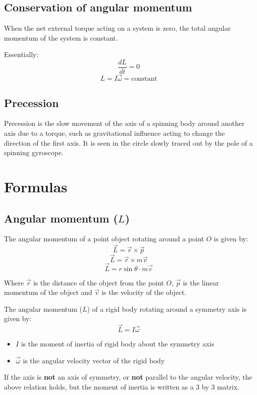 \documentclass[11pt]{article}
\begin{document}
\newpage
\subsection{Conservation of angular momentum}
\label{sec:org2fcfb08}
When the net external torque acting on a system is zero, the total angular momentum of the system is constant.


Essentially:
\[\frac{dL}{dt} = 0\]
\[L = I \vec{\omega} = \text{constant}\]
\subsection{Precession}
\label{sec:orgd465672}
Precession is the slow movement of the axis of a spinning body around another axis due to a torque, such as gravitational influence acting to change the direction of the first axis. It is seen in the circle slowly traced out by the pole of a spinning gyroscope.
\section{Formulas}
\label{sec:org6a5db6c}

\subsection{Angular momentum (\(L\))}
\label{sec:org268d8e3}
The angular momentum of a point object rotating around a point \(O\) is given by:
\[\vec{L} = \vec{r} \times \vec{p}\]
\[\vec{L} = \vec{r} \times m \vec{v}\]
\[\vec{L} = r \sin \theta \cdot m \vec{v}\]

Where \(\vec{r}\) is the distance of the object from the point \(O\), \(\vec{p}\) is the linear momentum of the object and \(\vec{v}\) is the velocity of the object.


The angular momentum (\(L\)) of a rigid body rotating around a symmetry axis is given by:
\[\vec{L} = I \vec{\omega}\]

\begin{itemize}
\item \(I\) is the moment of inertia of rigid body about the symmetry axis
\item \(\vec{\omega}\) is the angular velocity vector of the rigid body
\end{itemize}

If the axis is \textbf{not} an axis of symmetry, or \textbf{not} parallel to the angular velocity, the above relation holds, but the moment of inertia is written as a 3 by 3 matrix.
\end{document}
